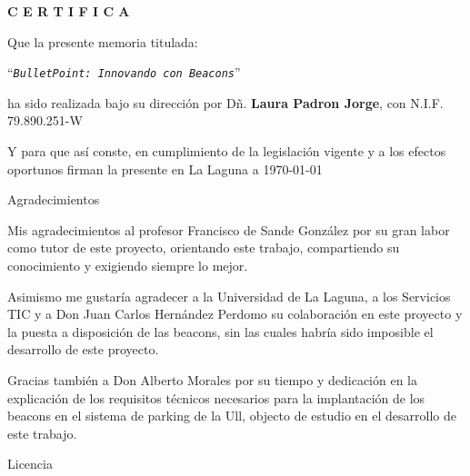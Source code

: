 \documentclass[spanish,a4paper,14pt,oneside]{extreport}
\newcommand{\BulletPoint}{\texttt{BulletPoint:{ Innovando con Beacons}}}
\begin{document}
\bigskip

\bigskip
\bigskip
{\bf C E R T I F I C A}

\bigskip
\bigskip
\bigskip
Que la presente memoria titulada:

\bigskip
``{\it \BulletPoint{}}''

\bigskip
\bigskip
\bigskip
\noindent ha sido realizada bajo su dirección por Dñ. {\bf Laura Padron Jorge},
con N.I.F. 79.890.251-W

\bigskip
\bigskip

Y para que así conste, en cumplimiento de la legislación vigente y a los efectos
oportunos firman la presente en La Laguna a \today

\newpage
\thispagestyle{empty}

{ \flushright

\begin{LARGE}
Agradecimientos
\end{LARGE}

\hspace{3mm}

\begin{large}


\hspace{3mm}

Mis agradecimientos al profesor Francisco de Sande González por su gran labor como tutor de este proyecto, orientando este trabajo, compartiendo su conocimiento y exigiendo siempre lo mejor. 

Asimismo me gustaría agradecer a la Universidad de La Laguna, a los Servicios TIC y a Don Juan Carlos Hernández Perdomo su colaboración en este proyecto y  la puesta a disposición de las beacons, sin las cuales habría sido imposible el desarrollo de este proyecto. 

Gracias también a Don Alberto Morales por su tiempo y dedicación en la explicación de los requisitos técnicos necesarios para la implantación de los beacons en el sistema de parking de la Ull, objecto de estudio en el desarrollo de este trabajo.

\end{large}

}

\newpage

\begin{huge}
Licencia
\end{huge}
\end{document}
